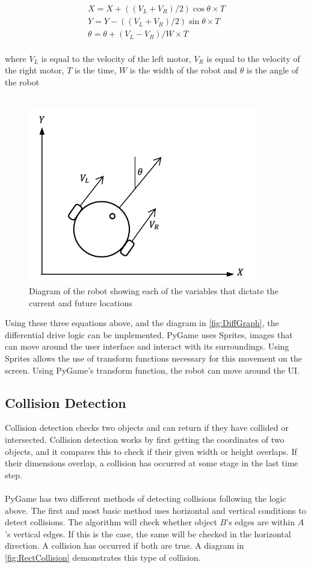 \documentclass[a4paper,12pt]{article}
\begin{document}
\begin{equation}
\begin{aligned}
X = X+((V_L+V_R)/2) \cos\theta \times T \\
Y=Y-((V_L+V_R)/2) \sin\theta \times T \\
\theta=\theta+(V_L-V_R)/W \times T
\end{aligned}
\end{equation}\\
where $V_L$ is equal to the velocity of the left motor, $V_R$ is equal to the velocity of the right motor, $T$ is the time, $W$ is the width of the robot and $\theta$ is the angle of the robot\\\\
\begin{figure}[H]
\centering
\includegraphics[width=10cm]{imgs/DiffGraph.png}
\centering
\caption{Diagram of the robot showing each of the variables that dictate the current and future locations}
\label{fig:DiffGraph}
\end{figure}
\noindent
Using these three equations above, and the diagram in \autoref{fig:DiffGraph}, the differential drive logic can be implemented. PyGame uses Sprites, images that can move around the user interface and interact with its surroundings. Using Sprites allows the use of transform functions necessary for this movement on the screen. Using PyGame's transform function, the robot can move around the UI.

\subsection{Collision Detection}
Collision detection checks two objects and can return if they have collided or intersected. Collision detection works by first getting the coordinates of two objects, and it compares this to check if their given width or height overlaps. If their dimensions overlap, a collision has occurred at some stage in the last time step.
\\\\
PyGame has two different methods of detecting collisions following the logic above. The first and most basic method uses horizontal and vertical conditions to detect collisions. The algorithm will check whether object $B$'s edges are within $A$'s vertical edges. If this is the case, the same will be checked in the horizontal direction. A collision has occurred if both are true. A diagram in \autoref{fig:RectCollision} demonstrates this type of collision.
\end{document}
